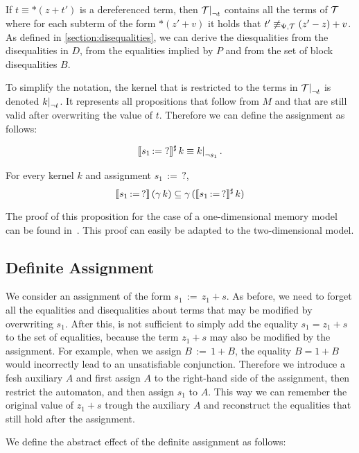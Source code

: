 If $t \equiv *(z + t')$ is a dereferenced term, then $\restr{\T}{\neg t}$ contains all the terms of $\mathcal{T}$ where for each subterm of the form $*(z' + v)$ it holds that $t' \not\equiv_{\Psi,\mathcal{T}} (z' - z) + v$.
As defined in \cref{section:disequalities}, we can derive the diesqualities from the disequalities in $D$, from the equalities
implied by $P$ and from the set of block disequalities $B$.

To simplify the notation, the kernel that is restricted to the terms in $\restr{\T}{\neg t}$ is denoted $\restr{k}{\neg t}$.
It represents all propositions that follow from $M$ and that are still valid after overwriting the value of $t$.
Therefore we can define the assignment as follows:

\[
	\sem{s_1\,{:=}\;?}^\sharp\,k \equiv \restr{k}{\neg s_1}.
\]

\begin{proposition}\label{p:ass-unknown}
	For every kernel $k$ and assignment $s_1\,{:=}\,?$,
	\[
		\llbracket s_1\,{:=}\,?\rrbracket\,(\gamma\,k) \subseteq \gamma\,(\llbracket s_1\,{:=}\,?\rrbracket^\sharp\,k)
	\]
\end{proposition}

The proof of this proposition for the case of a one-dimensional memory model can be found in~\cite{2pointer}.
This proof can easily be adapted to the two-dimensional model.

\subsection{Definite Assignment}

We consider an assignment of the form $s_1\,{:=}\,z_1+s$.
As before, we need to forget all the equalities and disequalities about terms that may be modified by overwriting $s_1$.
After this, is not sufficient to simply add the equality $s_1 = z_1+s$ to the set of equalities,
because the term $z_1 + s$ may also be modified by the assignment. For example, when we assign $B\,{:=}\,1+B$, the equality $B = 1 + B$ would incorrectly lead to an unsatisfiable conjunction.
Therefore we introduce a fesh auxiliary $A$ and first assign $A$ to the right-hand side of the assignment, then restrict the automaton, and then assign $s_1$ to $A$.
This way we can remember the original value of $z_1 + s$ trough the auxiliary $A$ and reconstruct the equalities that still hold after the assignment.

We define the abstract effect of the definite assignment as follows:

